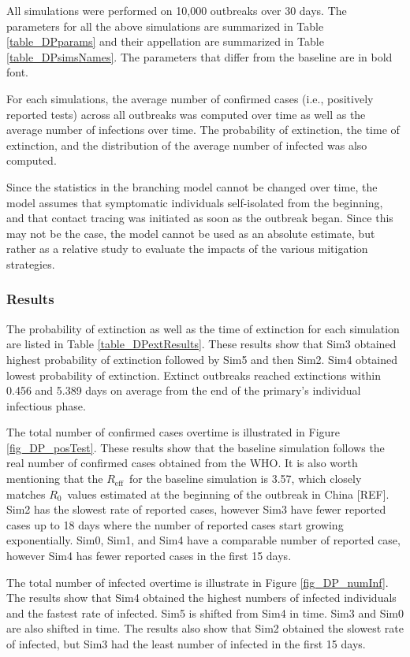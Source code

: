 \documentclass[sr]{drdc-report}
\def\Rz{\ensuremath{R_0}}
\def\Reff{\ensuremath{R_\mathrm{eff}}}
\begin{document}
All simulations were performed on 10,000 outbreaks over 30 days. The parameters for all the above simulations are summarized in Table \ref{table_DPparams} and their appellation are summarized in Table \ref{table_DPsimsNames}. The parameters that differ from the baseline are in bold font.  

For each simulations, the average number of confirmed cases (i.e., positively reported tests) across all outbreaks was computed over time as well as the average number of infections over time. The probability of extinction, the time of extinction, and the distribution of the average number of infected was also computed. 

Since the statistics in the branching model cannot be changed over time, the model assumes that symptomatic individuals self-isolated from the beginning, and that contact tracing was initiated as soon as the outbreak began. Since this may not be the case, the model cannot be used as an absolute estimate, but rather as a relative study to evaluate the impacts of the various mitigation strategies. 

\subsubsection{Results}
The probability of extinction as well as the time of extinction for each simulation are listed in Table \ref{table_DPextResults}. These results show that Sim3 obtained highest probability of extinction followed by Sim5 and then Sim2. Sim4 obtained lowest probability of extinction. Extinct outbreaks reached extinctions within 0.456 and 5.389 days on average from the end of the primary's individual infectious phase. 

The total number of confirmed cases overtime is illustrated in Figure \ref{fig_DP_posTest}. These results show that the baseline simulation follows the real number of confirmed cases obtained from the WHO. It is also worth mentioning that the \Reff\ for the baseline simulation is 3.57, which closely matches \Rz\ values estimated at the beginning of the outbreak in China [REF]. Sim2 has the slowest rate of reported cases, however Sim3 have fewer reported cases up to 18 days where the number of reported cases start growing exponentially. Sim0, Sim1, and Sim4 have a comparable number of reported case, however Sim4 has fewer reported cases in the first 15 days. 

The total number of infected overtime is illustrate in Figure \ref{fig_DP_numInf}. The results show that Sim4 obtained the highest numbers of infected individuals and the fastest rate of infected. Sim5 is shifted from Sim4 in time. Sim3 and Sim0 are also shifted in time. The results also show that Sim2 obtained the slowest rate of infected, but Sim3 had the least number of infected in the first 15 days. 
\end{document}
